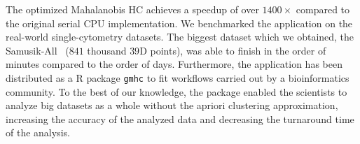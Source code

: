 The optimized Mahalanobis HC achieves a speedup of over $1400\times$ compared to the original serial CPU implementation. We benchmarked the application on the real-world single-cytometry datasets. The biggest dataset which we obtained, the Samusik-All~\cite{flowrepo} ($841$ thousand $39$D points), was able to finish in the order of minutes compared to the order of days. Furthermore, the application has been distributed as a R package \texttt{gmhc} to fit workflows carried out by a bioinformatics community. To the best of our knowledge, the package enabled the scientists to analyze big datasets as a whole without the apriori clustering approximation, increasing the accuracy of the analyzed data and decreasing the turnaround time of the analysis.




